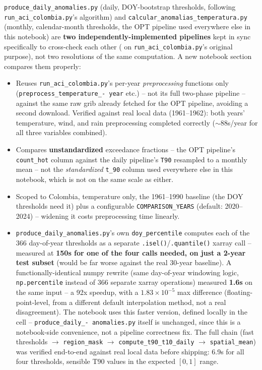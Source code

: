\documentclass[11pt]{article}
\begin{document}
\texttt{produce\_daily\_anomalies.py} (daily, DOY-bootstrap thresholds,
following \texttt{run\_aci\_colombia.py}'s algorithm) and
\texttt{calcular\_anomalias\_temperatura.py} (monthly, calendar-month
thresholds, the OPT pipeline used everywhere else in this notebook) are
\textbf{two independently-implemented pipelines} kept in sync specifically
to cross-check each other ( on
\texttt{run\_aci\_colombia.py}'s original purpose), not two resolutions of
the same computation. A new notebook section compares them properly:

\begin{itemize}[leftmargin=*]
\item Reuses \texttt{run\_aci\_colombia.py}'s per-year
  \emph{preprocessing} functions only (\texttt{preprocess\_temperature\_-
  year} etc.) -- not its full two-phase pipeline -- against the same raw
  grib already fetched for the OPT pipeline, avoiding a second download.
  Verified against real local data (1961--1962): both years' temperature,
  wind, and rain preprocessing completed correctly ($\sim$88s/year for all
  three variables combined).
\item Compares \textbf{unstandardized} exceedance fractions -- the OPT
  pipeline's \texttt{count\_hot} column against the daily pipeline's
  \texttt{T90} resampled to a monthly mean -- not the \emph{standardized}
  \texttt{t\_90} column used everywhere else in this notebook, which is
  not on the same scale as either.
\item Scoped to Colombia, temperature only, the 1961--1990 baseline (the
  DOY thresholds need it) plus a configurable \texttt{COMPARISON\_YEARS}
  (default: 2020--2024) -- widening it costs preprocessing time linearly.
\item \texttt{produce\_daily\_anomalies.py}'s own \texttt{doy\_percentile}
  computes each of the 366 day-of-year thresholds as a separate
  \texttt{.isel()}/\texttt{.quantile()} xarray call -- measured at
  \textbf{150s for one of the four calls needed, on just a 2-year test
  subset} (would be far worse against the real 30-year baseline). A
  functionally-identical numpy rewrite (same day-of-year windowing logic,
  \texttt{np.percentile} instead of 366 separate xarray operations) measured
  \textbf{1.6s} on the same input -- a 92x speedup, with a $1.83\times
  10^{-5}$ max difference (floating-point-level, from a different default
  interpolation method, not a real disagreement). The notebook uses this
  faster version, defined locally in the cell -- \texttt{produce\_daily\_-
  anomalies.py} itself is unchanged, since this is a notebook-side
  convenience, not a pipeline correctness fix. The full chain (fast
  thresholds $\to$ \texttt{region\_mask} $\to$
  \texttt{compute\_t90\_t10\_daily} $\to$ \texttt{spatial\_mean}) was
  verified end-to-end against real local data before shipping: 6.9s for
  all four thresholds, sensible T90 values in the expected $[0,1]$ range.
\end{itemize}
\end{document}

